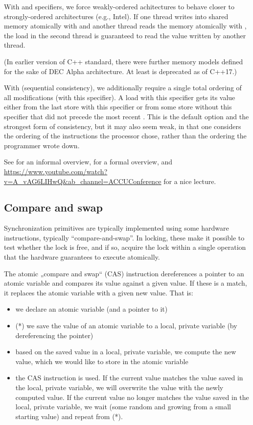 With  and  specifiers, we force  weakly-ordered achitectures to behave closer to strongly-ordered architectures (e.g., Intel). If one thread writes into shared memory atomically with  and another thread reads the memory atomically with , the load in the second thread is guaranteed to read the value written by another thread. 

(In earlier version of C++ standard, there were further memory models defined for the sake of DEC Alpha architecture. At least  is deprecated as of C++17.) 

With  (sequential consistency), we additionally require a single total ordering of all modifications (with this specifier). A load with this specifier gets its value either from the last store with this specifier or from some store without this specifier that did not precede the most recent . This is the default option and the strongest form of consistency, but it may also seem weak, in that one considers the ordering of the instructions the processor chose, rather than the ordering the programmer wrote down. 

See \cite{Poter2018} for an informal overview, \cite{Alglave2012} for a formal overview, and \url{https://www.youtube.com/watch?v=A_vAG6LIHwQ&ab_channel=ACCUConference} for a nice lecture. 

\subsection{Compare and swap}

Synchronization primitives are typically implemented using some hardware instructions, typically ``compare-and-swap''. In locking, these make it possible to test whether the lock is free, and if so, acquire the lock within a single operation that the hardware guarantees to execute atomically.

The atomic „compare and swap“ (CAS) instruction dereferences a pointer to an atomic variable and compares its value against a given value. If these is a match, it replaces the atomic variable with a given new value. That is:
\begin{itemize}
\item we declare an atomic variable (and a pointer to it)
\item (*) we save the value of an atomic variable to a local, private variable (by dereferencing the pointer)
\item based on the saved value in a local, private variable, we compute the new value, which we would like to store in the atomic variable
\item the CAS instruction is used. If the current value matches the value saved in the local, private variable, we will overwrite the value with the newly computed value. If the current value no longer matches the value saved in the local, private variable, we wait (some random and growing from a small starting value) and repeat from (*). 
\end{itemize}

